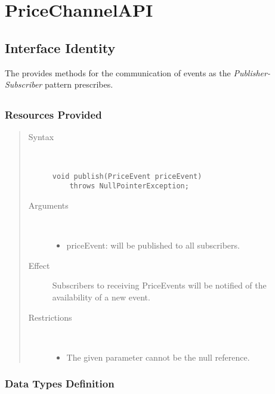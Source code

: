 \section{PriceChannelAPI}
\label{api:other-price-channel-api}

\subsection{Interface Identity}

\npar The  provides methods for the communication of
events as the \emph{Publisher-Subscriber} pattern prescribes.

\subsection{}

\subsubsection{Resources Provided}

\begin{quote}
	\begin{description}
		\item[Syntax] \
		\begin{verbatim}
void publish(PriceEvent priceEvent)
    throws NullPointerException;
		\end{verbatim}
		\item[Arguments] \
		\begin{itemize}
		  \item priceEvent: will be published to all subscribers.
		\end{itemize}
		\item[Effect] Subscribers to receiving PriceEvents will be notified of
		the availability of a new event. 
		\item[Restrictions] \
		\begin{itemize}
		  \item The given parameter cannot be the null reference.
		\end{itemize}
	\end{description}
\end{quote}

\subsubsection{Data Types Definition}

